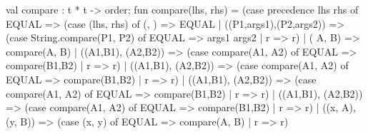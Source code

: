 \nwenddocs{}\plusendmoddef\nwstartdeflinemarkup{}\nwenddeflinemarkup
val compare : t * t -> order;
\nwendcode{}\nwdocspar
\nwenddocs{}\endmoddef\nwstartdeflinemarkup{}\nwenddeflinemarkup
fun compare(lhs, rhs) =
 (case precedence lhs rhs of
   EQUAL => (case (lhs, rhs) of
              (, ) => EQUAL
            | ((P1,args1),(P2,args2)) =>
              (case String.compare(P1, P2) of
                EQUAL =>  args1 args2
              | r => r)
            | ( A,  B) => compare(A, B)
            | ((A1,B1), (A2,B2)) => 
                (case compare(A1, A2) of
                  EQUAL => compare(B1,B2)
                | r => r)
            | ((A1,B1), (A2,B2)) => 
                (case compare(A1, A2) of
                  EQUAL => compare(B1,B2)
                | r => r)
            | ((A1,B1), (A2,B2)) => 
                (case compare(A1, A2) of
                  EQUAL => compare(B1,B2)
                | r => r)
            | ((A1,B1), (A2,B2)) => 
                (case compare(A1, A2) of
                  EQUAL => compare(B1,B2)
                | r => r)
            | ((x, A), (y, B)) =>
                (case (x, y) of
                  EQUAL => compare(A, B)
                | r => r)
